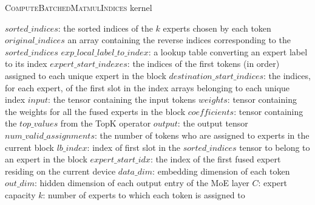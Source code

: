 \begin{algorithm}[H]
  \caption{\textsc{ComputeBatchedMatmulIndices} kernel}
  \label{alg:compute-batched-matmul-indices}
  \small
  \begin{algorithmic}[1]
    \Ensure $sorted\_indices$: the sorted indices of the $k$ experts chosen by each token
    \Ensure $original\_indices$ an array containing the reverse indices corresponding to the $sorted\_indices$
    \Ensure $exp\_local\_label\_to\_index$: a lookup table converting an expert label to its index
    \Ensure $expert\_start\_indexes$: the indices of the first tokens (in order) assigned to each unique expert in the block
    \Ensure $destination\_start\_indices$: the indices, for each expert, of the first slot in the index arrays belonging to each unique index
    \Ensure $input$: the tensor containing the input tokens
    \Ensure $weights$: tensor containing the weights for all the fused experts in the block
    \Ensure $coefficients$: tensor containing the $top\_values$ from the TopK operator
    \Ensure $output$: the output tensor
    \Ensure $num\_valid\_assignments$: the number of tokens who are assigned to experts in the current block
    \Ensure $lb\_index$: index of first slot in the $sorted\_indices$ tensor to belong to an expert in the block
    \Ensure $expert\_start\_idx$: the index of the first fused expert residing on the current device
    \Ensure $data\_dim$: embedding dimension of each token
    \Ensure $out\_dim$: hidden dimension of each output entry of the MoE layer
    \Ensure $C$: expert capacity
    \Ensure $k$: number of experts to which each token is assigned to
    
    \vspace{0.5cm}
    

\end{algorithmic}
\end{algorithm}
